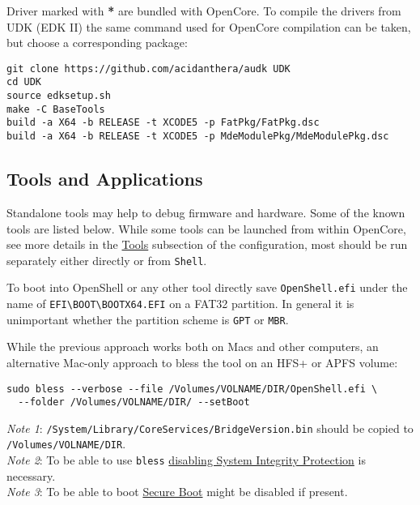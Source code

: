 \documentclass[]{article}
\begin{document}
Driver marked with \textbf{*} are bundled with OpenCore.
To compile the drivers from UDK (EDK II) the same command used for
OpenCore compilation can be taken, but choose a corresponding package:
\begin{lstlisting}[label=compileudk, style=ocbash]
git clone https://github.com/acidanthera/audk UDK
cd UDK
source edksetup.sh
make -C BaseTools
build -a X64 -b RELEASE -t XCODE5 -p FatPkg/FatPkg.dsc
build -a X64 -b RELEASE -t XCODE5 -p MdeModulePkg/MdeModulePkg.dsc
\end{lstlisting}

\subsection{Tools and Applications}\label{uefitools}

Standalone tools may help to debug firmware and hardware. Some of the known tools are listed below.
While some tools can be launched from within OpenCore, see more details in
the \hyperref[misctools]{Tools} subsection of the configuration, most should be run
separately either directly or from \texttt{Shell}.

To boot into OpenShell or any other tool directly save \texttt{OpenShell.efi}
under the name of \texttt{EFI\textbackslash BOOT\textbackslash BOOTX64.EFI}
on a FAT32 partition. In general it is unimportant whether the partition scheme
is \texttt{GPT} or \texttt{MBR}.

While the previous approach works both on Macs and other computers,
an alternative Mac-only approach to bless the tool on an HFS+ or APFS
volume:

\begin{lstlisting}[caption=Blessing tool, label=blesstool, style=ocbash]
sudo bless --verbose --file /Volumes/VOLNAME/DIR/OpenShell.efi \
  --folder /Volumes/VOLNAME/DIR/ --setBoot
\end{lstlisting}

\emph{Note 1}: \texttt{/System/Library/CoreServices/BridgeVersion.bin} should be copied
  to \texttt{/Volumes/VOLNAME/DIR}. \\
\emph{Note 2}: To be able to use \texttt{bless}
  \href{https://developer.apple.com/library/archive/documentation/Security/Conceptual/System_Integrity_Protection_Guide/ConfiguringSystemIntegrityProtection/ConfiguringSystemIntegrityProtection.html}{disabling System Integrity Protection} is necessary. \\
\emph{Note 3}: To be able to boot \href{https://support.apple.com/HT208330}{Secure Boot}
  might be disabled if present.
\end{document}
